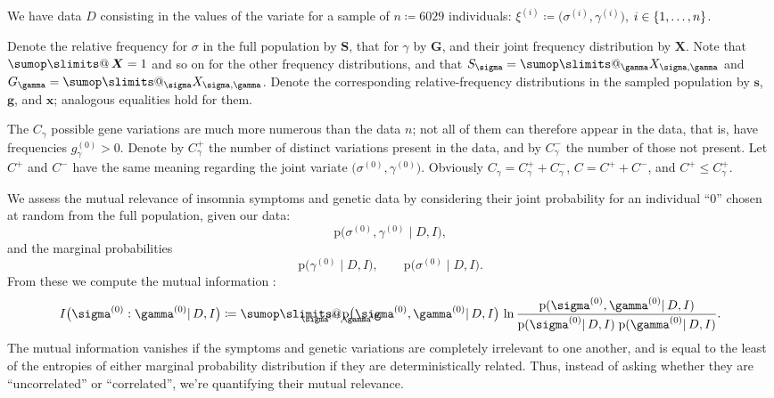\documentclass[\ifafour a4paper,12pt,\else a5paper,10pt,\fi%
onecolumn,oneside,article,%
british%
]{memoir}
\makeatletter
\theoremstyle{remark}
\theoremstyle{innote}
\def\sum{\DOTSI\sumop\slimits@}
\newcommand*{\citep}{\parencites}
\newcommand*{\defd}{\coloneqq}
\renewcommand{\le}{\leqslant}%
\DeclarePairedDelimiter\set{\{}{\}}
\newcommand*{\pf}{\mathrm{p}}%
\renewcommand*{\|}{\mathpunct{|}}
\newcommand*{\sect}{\S}%
\newcommand*{\chap}{ch.}%
\newcommand*{\tsum}{\mathop{\textstyle\sum}\nolimits}
\newcommand*{\yD}{D}
\newcommand*{\yI}{I}
\newcommand*{\mI}{I}
\newcommand*{\ysum}{\tsum}
\newcommand*{\ys}{\sigma}
\newcommand*{\yg}{\gamma}
\newcommand*{\ysi}[1]{\ys^{(#1)}}
\newcommand*{\ygi}[1]{\yg^{(#1)}}
\newcommand*{\yFs}{\bm{S}}
\newcommand*{\yfs}{\bm{s}}
\newcommand*{\yFg}{\bm{G}}
\newcommand*{\yfg}{\bm{g}}
\newcommand*{\yv}{\xi}
\newcommand*{\yvi}[1]{\yv^{(#1)}}
\newcommand*{\yF}{\bm{X}}
\newcommand*{\yf}{\bm{x}}
\newcommand*{\yCg}{C_{\gamma}}
\newcommand*{\yCgd}{\yCg^{+}}
\newcommand*{\yCgn}{\yCg^{-}}
\newcommand*{\yCd}{C^{+}}
\newcommand*{\yCn}{C^{-}}
\makeatother
\begin{document}
We have data $\yD$ consisting in the values of the variate for a sample of
$n\defd 6029$ individuals: $\yvi{i} \defd \bigl( \ysi{i}, \ygi{i} \bigr)$,
$i \in \set{1,\dotsc,n}$.

Denote the relative frequency for $\ys$ in the full population by $\yFs$,
that for $\yg$ by $\yFg$, and their joint frequency distribution by $\yF$.
Note that $\ysum\yF=1$ and so on for the other frequency distributions, and
that $S_{\ys}=\sum_{\yg}X_{\ys,\yg}$ and
$G_{\yg}=\sum_{\ys}X_{\ys,\yg}$. Denote the corresponding
relative-frequency distributions in the sampled population by $\yfs$,
$\yfg$, and $\yf$; analogous equalities hold for them.

The $\yCg$ possible gene variations are much more numerous than the data
$n$; not all of them can therefore appear in the data, that is, have
frequencies $g_\ygi{0}>0$. Denote by $\yCgd$ the number of distinct
variations present in the data, and by $\yCgn$ the number of those not
present. Let $\yCd$ and $\yCn$ have the same meaning regarding the joint
variate $\bigl( \ysi{0}, \ygi{0} \bigr)$. Obviously $\yCg = \yCgd+\yCgn$,
$C=\yCd+\yCn$, and $\yCd \le \yCgd$.

We assess the mutual relevance of insomnia symptoms and genetic data by
considering their joint probability for an individual \enquote{$0$} chosen
at random from the full population, given our data:
\begin{equation}
  \label{eq:joint_prob_new_ind}
  \pf\bigl(\ysi{0}, \ygi{0} \| \yD, \yI\bigr),
\end{equation}
and the marginal probabilities
\begin{equation}
  \label{eq:marginals_new_ind}
  \pf\bigl( \ygi{0} \| \yD, \yI\bigr),
  \qquad
    \pf\bigl(\ysi{0} \| \yD, \yI\bigr).
\end{equation}
From these we compute the mutual information \citep[in these called
\enquote{rate of
  transmission}]{shannon1948,kelly1956}[\sect~14.7]{pressetal1988_r2007}[\chap~2]{coveretal1991_r2006}:
\begin{equation}
  \label{eq:mutual_info_new_ind}
  \mI\bigl( \ysi{0} : \ygi{0} \| \yD,\yI \bigr) \defd
  \sum_{\mathclap{\ysi{0},\ygi{0}}} \pf\bigl(\ysi{0}, \ygi{0} \| \yD, \yI\bigr)
 \, \ln\frac{\pf(\ysi{0}, \ygi{0} \| \yD, \yI)}{
    \pf(\ysi{0} \| \yD, \yI)\;
    \pf(\ygi{0} \| \yD, \yI)}.
\end{equation}
The mutual information vanishes if the symptoms and genetic variations are
completely irrelevant to one another, and is equal to the least of the
entropies of either marginal probability distribution if they are
deterministically related. Thus, instead of asking whether they are
\enquote{uncorrelated} or \enquote{correlated}, we're quantifying their
mutual relevance.
\end{document}
